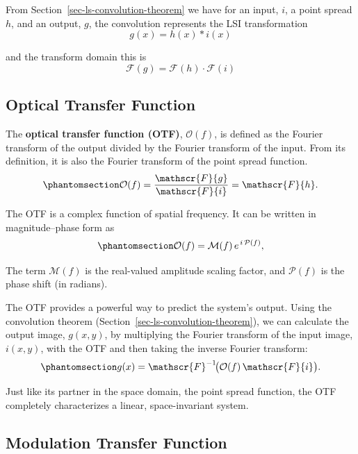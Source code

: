 \documentclass[
  letterpaper,
]{book}
\begin{document}
From Section~\ref{sec-ls-convolution-theorem} we have for an input,
\(i\), a point spread \(h\), and an output, \(g\), the convolution
represents the LSI transformation \[
g(x) = h(x) * i (x)
\]

and the transform domain this is \[
\mathscr{F}(g) = \mathscr{F}(h) \cdot \mathscr{F}(i)
\]

\subsection{Optical Transfer Function}\label{sec-OTF}

The \textbf{optical transfer function (OTF)}, \(\mathcal{O}(f)\), is
defined as the Fourier transform of the output divided by the Fourier
transform of the input. From its definition, it is also the Fourier
transform of the point spread function.
\begin{equation}\phantomsection\label{eq-otf-definition}{
\mathcal{O}(f) = \frac{\mathscr{F}\{g\}}{\mathscr{F}\{i\}} = \mathscr{F}\{h\}.
}\end{equation}

The OTF is a complex function of spatial frequency. It can be written in
magnitude--phase form as
\begin{equation}\phantomsection\label{eq-otf-definition-complex}{
\mathcal{O}(f) = \mathcal{M}(f)\, e^{\,i\,\mathcal{P}(f)},
}\end{equation}

The term \(\mathcal{M}(f)\) is the real-valued amplitude scaling factor,
and \(\mathcal{P}(f)\) is the phase shift (in radians).

The OTF provides a powerful way to predict the system's output. Using
the convolution theorem (Section~\ref{sec-ls-convolution-theorem}), we
can calculate the output image, \(g(x,y)\), by multiplying the Fourier
transform of the input image, \(i(x,y)\), with the OTF and then taking
the inverse Fourier transform:
\begin{equation}\phantomsection\label{eq-otf-calculation}{
g(x) = \mathscr{F}^{-1}\!\big( \mathcal{O}(f)\,\mathscr{F}\{i\} \big).
}\end{equation}

Just like its partner in the space domain, the point spread function,
the OTF completely characterizes a linear, space-invariant system.

\subsection{Modulation Transfer Function}\label{sec-MTF}
\end{document}
